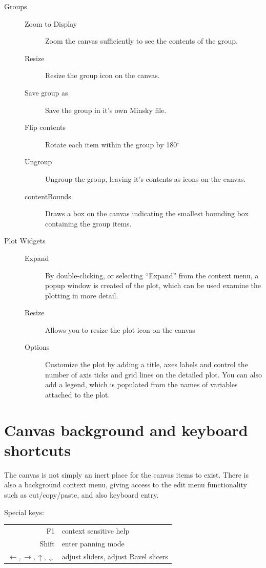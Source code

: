 \begin{description}
\item[Groups]\mbox{}
  \begin{description}
  \item[Zoom to Display] Zoom the canvas sufficiently to see the
    contents of the group.
  \item[Resize] Resize the group icon on the canvas.
  \item[Save group as] Save the group in it's own Minsky file.
  \item[Flip contents] Rotate each item within the group by
    180$^\circ$
  \item[Ungroup] Ungroup the group, leaving it's contents as icons on
    the canvas.
  \item[contentBounds] Draws a box on the canvas indicating the
    smallest bounding box containing the group items.
  \end{description}
        

\item[Plot Widgets]\mbox{}
  \begin{description}
  \item[Expand] By double-clicking, or selecting ``Expand'' from the
    context menu, a popup window is created of the plot, which can be
    used examine the plotting in more detail.
          
  \item[Resize] Allows you to resize the plot icon on the canvas
  \item[Options] Customize the plot by adding a title, axes labels and
    control the number of axis ticks and grid lines on the detailed
    plot. You can also add a legend, which is populated from the names
    of variables attached to the plot.
  \end{description}
        
\end{description}

\section{Canvas background and keyboard shortcuts}

The canvas is not simply an inert place for the canvas items to
exist. There is also a background context menu, giving access to the
edit menu functionality such as cut/copy/paste, and also keyboard
entry.

Special keys:
\begin{tabular}{rl}
  F1 & context sensitive help\\
  Shift & enter panning mode\\
  $\leftarrow,\rightarrow,\uparrow,\downarrow$ & adjust sliders, adjust Ravel slicers\\
\end{tabular}  


